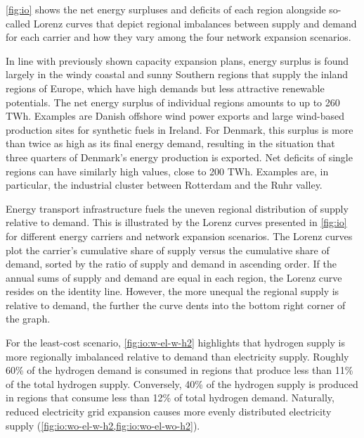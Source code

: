 \cref{fig:io} shows the net energy surpluses and deficits of each region
alongside so-called Lorenz curves that depict regional imbalances between supply
and demand for each carrier and how they vary among the four network expansion
scenarios.

In line with previously shown capacity expansion plans, energy surplus is found
largely in the windy coastal and sunny Southern regions that supply the inland
regions of Europe, which have high demands but less attractive renewable
potentials. The net energy surplus of individual regions amounts to up to 260
TWh. Examples are Danish offshore wind power exports and large wind-based
production sites for synthetic fuels in Ireland. For Denmark, this surplus is
more than twice as high as its final energy demand, resulting in the situation
that three quarters of Denmark's energy production is exported. Net deficits of
single regions can have similarly high values, close to 200 TWh. Examples are,
in particular, the industrial cluster between Rotterdam and the Ruhr valley.

Energy transport infrastructure fuels the uneven regional distribution of supply
relative to demand. This is illustrated by the Lorenz curves presented in
\cref{fig:io} for different energy carriers and network expansion scenarios. The
Lorenz curves plot the carrier's cumulative share of supply versus the
cumulative share of demand, sorted by the ratio of supply and demand in
ascending order. If the annual sums of supply and demand are equal in each
region, the Lorenz curve resides on the identity line. However, the more unequal
the regional supply is relative to demand, the further the curve dents into the
bottom right corner of the graph.

For the least-cost scenario, \cref{fig:io:w-el-w-h2} highlights that hydrogen
supply is more regionally imbalanced relative to demand than electricity supply.
Roughly 60\% of the hydrogen demand is consumed in regions that produce less
than 11\% of the total hydrogen supply. Conversely, 40\% of the hydrogen supply
is produced in regions that consume less than 12\% of total hydrogen demand.
Naturally, reduced electricity grid expansion causes more evenly distributed
electricity supply (\cref{fig:io:wo-el-w-h2,fig:io:wo-el-wo-h2}).


